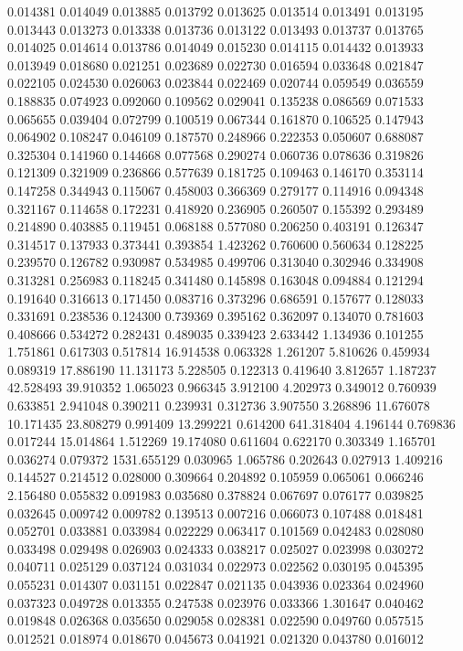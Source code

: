 0.014381
0.014049
0.013885
0.013792
0.013625
0.013514
0.013491
0.013195
0.013443
0.013273
0.013338
0.013736
0.013122
0.013493
0.013737
0.013765
0.014025
0.014614
0.013786
0.014049
0.015230
0.014115
0.014432
0.013933
0.013949
0.018680
0.021251
0.023689
0.022730
0.016594
0.033648
0.021847
0.022105
0.024530
0.026063
0.023844
0.022469
0.020744
0.059549
0.036559
0.188835
0.074923
0.092060
0.109562
0.029041
0.135238
0.086569
0.071533
0.065655
0.039404
0.072799
0.100519
0.067344
0.161870
0.106525
0.147943
0.064902
0.108247
0.046109
0.187570
0.248966
0.222353
0.050607
0.688087
0.325304
0.141960
0.144668
0.077568
0.290274
0.060736
0.078636
0.319826
0.121309
0.321909
0.236866
0.577639
0.181725
0.109463
0.146170
0.353114
0.147258
0.344943
0.115067
0.458003
0.366369
0.279177
0.114916
0.094348
0.321167
0.114658
0.172231
0.418920
0.236905
0.260507
0.155392
0.293489
0.214890
0.403885
0.119451
0.068188
0.577080
0.206250
0.403191
0.126347
0.314517
0.137933
0.373441
0.393854
1.423262
0.760600
0.560634
0.128225
0.239570
0.126782
0.930987
0.534985
0.499706
0.313040
0.302946
0.334908
0.313281
0.256983
0.118245
0.341480
0.145898
0.163048
0.094884
0.121294
0.191640
0.316613
0.171450
0.083716
0.373296
0.686591
0.157677
0.128033
0.331691
0.238536
0.124300
0.739369
0.395162
0.362097
0.134070
0.781603
0.408666
0.534272
0.282431
0.489035
0.339423
2.633442
1.134936
0.101255
1.751861
0.617303
0.517814
16.914538
0.063328
1.261207
5.810626
0.459934
0.089319
17.886190
11.131173
5.228505
0.122313
0.419640
3.812657
1.187237
42.528493
39.910352
1.065023
0.966345
3.912100
4.202973
0.349012
0.760939
0.633851
2.941048
0.390211
0.239931
0.312736
3.907550
3.268896
11.676078
10.171435
23.808279
0.991409
13.299221
0.614200
641.318404
4.196144
0.769836
0.017244
15.014864
1.512269
19.174080
0.611604
0.622170
0.303349
1.165701
0.036274
0.079372
1531.655129
0.030965
1.065786
0.202643
0.027913
1.409216
0.144527
0.214512
0.028000
0.309664
0.204892
0.105959
0.065061
0.066246
2.156480
0.055832
0.091983
0.035680
0.378824
0.067697
0.076177
0.039825
0.032645
0.009742
0.009782
0.139513
0.007216
0.066073
0.107488
0.018481
0.052701
0.033881
0.033984
0.022229
0.063417
0.101569
0.042483
0.028080
0.033498
0.029498
0.026903
0.024333
0.038217
0.025027
0.023998
0.030272
0.040711
0.025129
0.037124
0.031034
0.022973
0.022562
0.030195
0.045395
0.055231
0.014307
0.031151
0.022847
0.021135
0.043936
0.023364
0.024960
0.037323
0.049728
0.013355
0.247538
0.023976
0.033366
1.301647
0.040462
0.019848
0.026368
0.035650
0.029058
0.028381
0.022590
0.049760
0.057515
0.012521
0.018974
0.018670
0.045673
0.041921
0.021320
0.043780
0.016012
